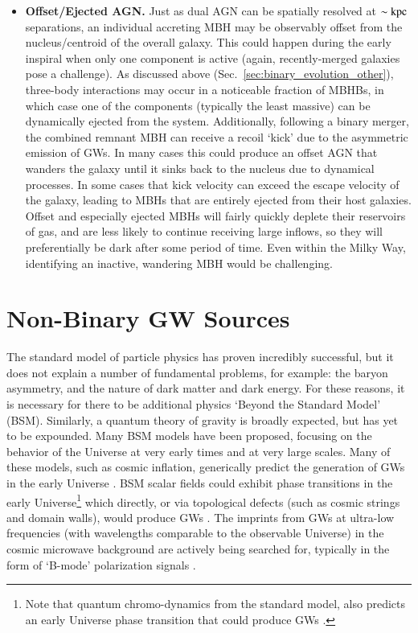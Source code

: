 \documentclass[onecolumn,authoryear]{els-mrw}
\begin{document}
\begin{itemize}
    \item \textbf{Offset/Ejected AGN.}  Just as dual AGN can be spatially resolved at $\sim \mathrm{kpc}$ separations, an individual accreting MBH may be observably offset from the nucleus/centroid of the overall galaxy.  This could happen during the early inspiral when only one component is active (again, recently-merged galaxies pose a challenge).  As discussed above (Sec.~\ref{sec:binary_evolution_other}), three-body interactions may occur in a noticeable fraction of MBHBs, in which case one of the components (typically the least massive) can be dynamically ejected from the system.  Additionally, following a binary merger, the combined remnant MBH can receive a recoil `kick' due to the asymmetric emission of GWs.  In many cases this could produce an offset AGN that wanders the galaxy until it sinks back to the nucleus due to dynamical processes.  In some cases that kick velocity can exceed the escape velocity of the galaxy, leading to MBHs that are entirely ejected from their host galaxies.  Offset and especially ejected MBHs will fairly quickly deplete their reservoirs of gas, and are less likely to continue receiving large inflows, so they will preferentially be dark after some period of time.  Even within the Milky Way, identifying an inactive, wandering MBH would be challenging.
\end{itemize}





\section{Non-Binary GW Sources}\label{sec:cosmo}

The standard model of particle physics has proven incredibly successful, but it does not explain a number of fundamental problems, for example: the baryon asymmetry, and the nature of dark matter and dark energy.  For these reasons, it is necessary for there to be additional physics `Beyond the Standard Model' (BSM).  Similarly, a quantum theory of gravity is broadly expected, but has yet to be expounded.  Many BSM models have been proposed, focusing on the behavior of the Universe at very early times and at very large scales.  Many of these models, such as cosmic inflation, generically predict the generation of GWs in the early Universe \citep{Maggiore-2000}.  BSM scalar fields could exhibit phase transitions in the early Universe\footnote{Note that quantum chromo-dynamics from the standard model, also predicts an early Universe phase transition that could produce GWs \citep{Witten-1984}.} which directly, or via topological defects (such as cosmic strings and domain walls), would produce GWs \citep{Kibble-1976}.  The imprints from GWs at ultra-low frequencies (with wavelengths comparable to the observable Universe) in the cosmic microwave background are actively being searched for, typically in the form of `B-mode' polarization signals \citep{Hu+White-1997}.
\end{document}
